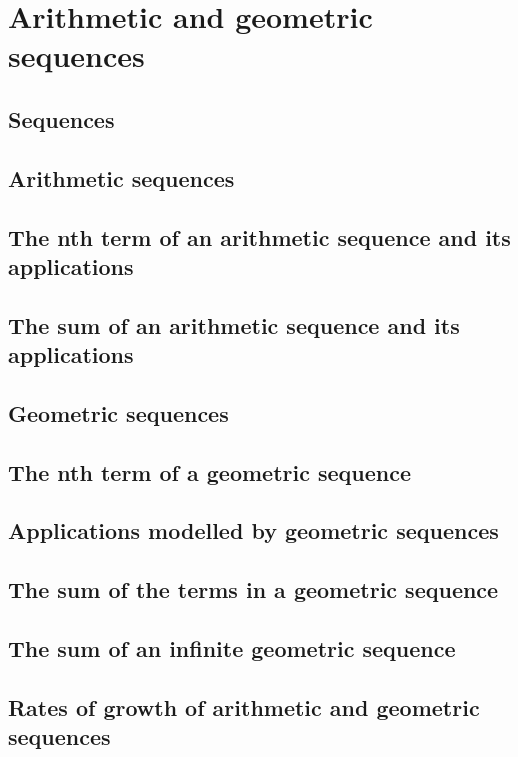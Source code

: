 \documentclass[a4paper,11pt]{article}
\begin{document}
\newpage

\section{Arithmetic and geometric sequences}
\begin{outline}

\0
\subsection{Sequences}

\0
\subsection{Arithmetic sequences}

\0
\subsection{The nth term of an arithmetic sequence and its applications}

\0
\subsection{The sum of an arithmetic sequence and its applications}

\0
\subsection{Geometric sequences}

\0
\subsection{The nth term of a geometric sequence}

\0
\subsection{Applications modelled by geometric sequences}

\0
\subsection{The sum of the terms in a geometric sequence}

\0
\subsection{The sum of an infinite geometric sequence}

\0
\subsection{Rates of growth of arithmetic and geometric sequences}

\end{outline}
\end{document}
